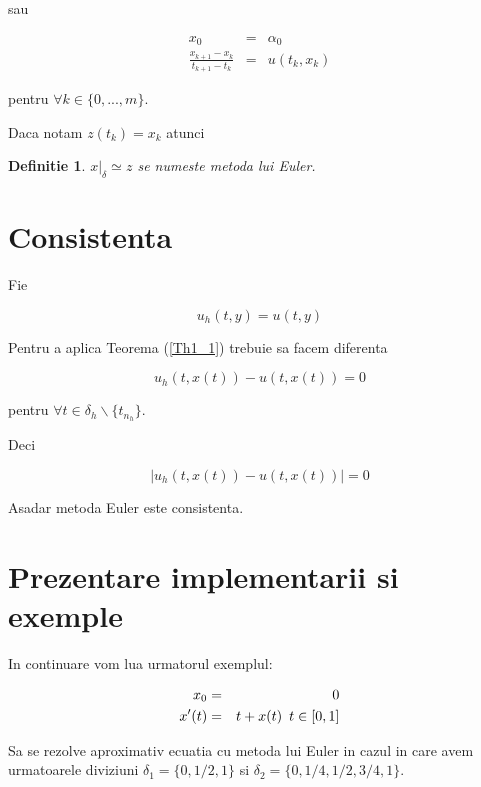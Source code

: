 \documentclass[a4paper,twoside]{book}
\newtheorem{definition}[theorem]{Definitie}
\begin{document}
sau

\begin{eqnarray*}
x_{0} &=&\alpha _{0} \\
\frac{x_{k+1}-x_{k}}{t_{k+1}-t_{k}} &=&u(t_{k},x_{k})
\end{eqnarray*}

pentru $\forall k\in \{0,...,m\}$.

Daca notam $z(t_{k})=x_{k}$ atunci

\begin{definition}
$x|_{\delta }\simeq z$ se numeste metoda lui Euler.
\end{definition}

\section{\protect\bigskip Consistenta}

Fie

\begin{equation*}
u_{h}(t,y)=u(t,y)
\end{equation*}

Pentru a aplica Teorema (\ref{Th1_1}) trebuie sa facem diferenta

\begin{equation*}
u_{h}(t,x(t))-u(t,x(t))=0
\end{equation*}

pentru $\forall t\in \delta _{h}\backslash \{t_{n_{h}}\}$.

Deci

\begin{equation*}
\left\vert u_{h}(t,x(t))-u(t,x(t))\right\vert =0
\end{equation*}

Asadar metoda Euler este consistenta.

\section{Prezentare implementarii si exemple}

In continuare vom lua urmatorul exemplul:

\begin{eqnarray*}
x_{0} &=&0 \\
x^{\prime }(t) &=&t+x(t)\text{\thinspace \thinspace \thinspace }t\in \lbrack
0,1]
\end{eqnarray*}

Sa se rezolve aproximativ ecuatia cu metoda lui Euler in cazul in care avem
urmatoarele diviziuni $\delta _{1}=\{0,1/2,1\}$ si $\delta
_{2}=\{0,1/4,1/2,3/4,1\}$.
\end{document}
